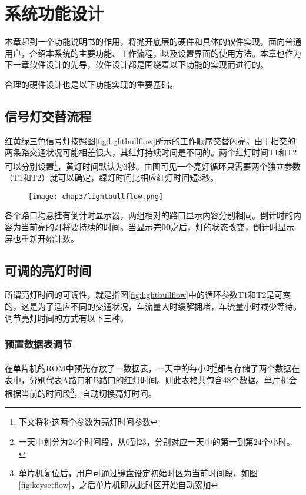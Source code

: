 
\chapter{系统功能设计}
\label{chap:functionintro} 
	本章起到一个功能说明书的作用，将抛开底层的硬件和具体的软件实现，面向普通用户，介绍本系统的主要功能、工作流程，以及设置界面的使用方法。本章也作为下一章软件设计的先导，软件设计都是围绕着以下功能的实现而进行的。
	
	合理的硬件设计也是以下功能实现的重要基础。
\section{信号灯交替流程}
	红黄绿三色信号灯按照图\ref{fig:lightbullflow}所示的工作顺序交替闪亮。由于相交的两条路交通状况可能相差很大，其红灯持续时间是不同的。两个红灯时间T1和T2可以分别设置\footnote{下文将称这两个参数为亮灯时间参数}，黄灯时间默认为3秒。由图可见一个亮灯循环只需要两个独立参数（T1和T2）就可以确定，绿灯时间比相应红灯时间短3秒。
	\begin{figure}[!tbh]
      \centering
      \texttt{[image: chap3/lightbullflow.png]}
    \end{figure}
    
	各个路口均悬挂有倒计时显示器，两组相对的路口显示内容分别相同。倒计时的内容为当前亮的灯将要持续的时间。当显示完\textbf{00}之后，灯的状态改变，倒计时显示屏也重新开始计数。 
	
\section{可调的亮灯时间}
所谓亮灯时间的可调性，就是指图\ref{fig:lightbullflow}中的循环参数T1和T2是可变的，这是为了适应不同的交通状况，车流量大时缓解拥堵，车流量小时减少等待。调节亮灯时间的方式有以下三种。
\subsection{预置数据表调节} 在单片机的ROM中预先存放了一数据表，一天中的每小时\footnote{一天中划分为24个时间段，从0到23，分别对应一天中的第一到第24个小时。}都有存储了两个数据在表中，分别代表A路口和B路口的红灯时间。则此表格共包含48个数据。单片机会根据当前的时间段\footnote{单片机复位后，用户可通过键盘设定初始时区为当前时间段，如图\ref{fig:keysetflow}，之后单片机即从此时区开始自动累加}，自动切换亮灯时间。
